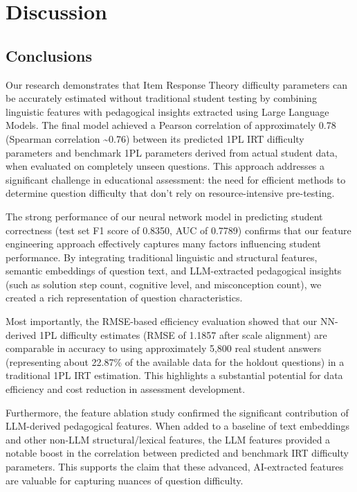 \documentclass[
    a4paper, %
    10pt, %
    twoside, %
]{LTJournalArticle}
\begin{document}
\section{Discussion}

\subsection{Conclusions}

Our research demonstrates that Item Response Theory difficulty parameters can be accurately estimated without traditional student testing by combining linguistic features with pedagogical insights extracted using Large Language Models. The final model achieved a Pearson correlation of approximately 0.78 (Spearman correlation \textasciitilde0.76) between its predicted 1PL IRT difficulty parameters and benchmark 1PL parameters derived from actual student data, when evaluated on completely unseen questions. This approach addresses a significant challenge in educational assessment: the need for efficient methods to determine question difficulty that don't rely on resource-intensive pre-testing.

The strong performance of our neural network model in predicting student correctness (test set F1 score of 0.8350, AUC of 0.7789) confirms that our feature engineering approach effectively captures many factors influencing student performance. By integrating traditional linguistic and structural features, semantic embeddings of question text, and LLM-extracted pedagogical insights (such as solution step count, cognitive level, and misconception count), we created a rich representation of question characteristics.

Most importantly, the RMSE-based efficiency evaluation showed that our NN-derived 1PL difficulty estimates (RMSE of 1.1857 after scale alignment) are comparable in accuracy to using approximately 5,800 real student answers (representing about 22.87\% of the available data for the holdout questions) in a traditional 1PL IRT estimation. This highlights a substantial potential for data efficiency and cost reduction in assessment development.

Furthermore, the feature ablation study confirmed the significant contribution of LLM-derived pedagogical features. When added to a baseline of text embeddings and other non-LLM structural/lexical features, the LLM features provided a notable boost in the correlation between predicted and benchmark IRT difficulty parameters. This supports the claim that these advanced, AI-extracted features are valuable for capturing nuances of question difficulty.
\end{document}

